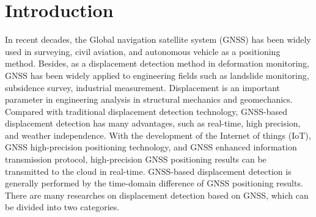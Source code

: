 \documentclass[final,3p,times]{elsarticle}
\begin{document}
	
	\section{Introduction}
	
	\label{intro}
	In recent decades, the Global navigation satellite system (GNSS) has been widely used in surveying, civil aviation, and autonomous vehicle as a positioning method\cite{barry2011surveying,iatsouk2004development}. 
	Besides, as a displacement detection method in deformation monitoring, GNSS has been widely applied to engineering fields such as landslide monitoring\cite{awange2012environmental}, subsidence survey\cite{bian2014monitoring}, industrial measurement\cite{pavasovic2011application}. 
	Displacement is an important parameter in engineering analysis in structural mechanics and geomechanics\cite{TASORA2020112635,BIGONI2020113315}.
	Compared with traditional displacement detection technology, GNSS-based displacement detection has many advantages, such as real-time, high precision, and weather independence\cite{shen2019a}. 
	With the development of the Internet of things (IoT), GNSS high-precision positioning technology, and GNSS enhanced information transmission protocol, high-precision GNSS positioning results can be transmitted to the cloud in real-time.
	GNSS-based displacement detection is generally performed by the time-domain difference of GNSS positioning results\cite{abidin2004use,rs12203375}. 
	There are many researches on displacement detection based on GNSS, which can be divided into two categories.
	
\end{document}
